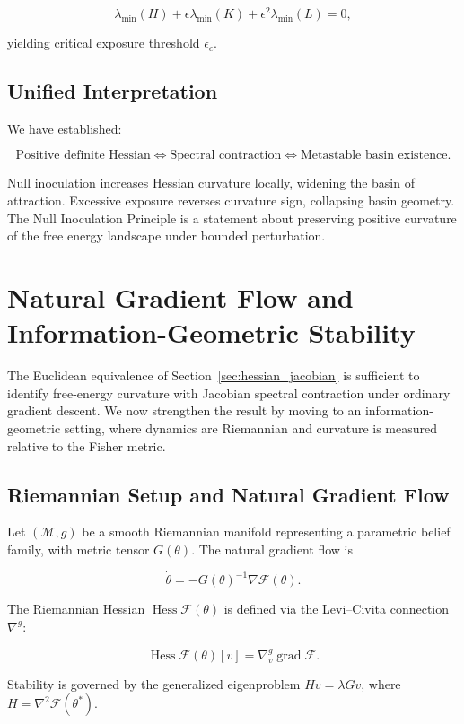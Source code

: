 \documentclass[11pt]{article}
\theoremstyle{remark}
\begin{document}
\[
\lambda_{\min}(H) + \epsilon \lambda_{\min}(K) + \epsilon^2 \lambda_{\min}(L) = 0,
\]

yielding critical exposure threshold $\epsilon_c$.

\subsection{Unified Interpretation}

We have established:

\[
\text{Positive definite Hessian}
\iff
\text{Spectral contraction}
\iff
\text{Metastable basin existence}.
\]

Null inoculation increases Hessian curvature locally, widening the basin of attraction. Excessive exposure reverses curvature sign, collapsing basin geometry. The Null Inoculation Principle is a statement about preserving positive curvature of the free energy landscape under bounded perturbation.

\section{Natural Gradient Flow and Information-Geometric Stability}
\label{sec:natural_gradient}

The Euclidean equivalence of Section~\ref{sec:hessian_jacobian} is sufficient to identify free-energy curvature with Jacobian spectral contraction under ordinary gradient descent. We now strengthen the result by moving to an information-geometric setting, where dynamics are Riemannian and curvature is measured relative to the Fisher metric.

\subsection{Riemannian Setup and Natural Gradient Flow}

Let $(\mathcal{M}, g)$ be a smooth Riemannian manifold representing a parametric belief family, with metric tensor $G(\theta)$. The natural gradient flow is

\[
\dot{\theta} = - G(\theta)^{-1}\nabla \mathcal{F}(\theta).
\]

The Riemannian Hessian $\operatorname{Hess}\mathcal{F}(\theta)$ is defined via the Levi--Civita connection $\nabla^g$:

\[
\operatorname{Hess}\mathcal{F}(\theta)[v] = \nabla^{\!g}_v \operatorname{grad}\mathcal{F}.
\]

Stability is governed by the generalized eigenproblem $H v = \lambda G v$, where $H = \nabla^2\mathcal{F}(\theta^*)$.
\end{document}
